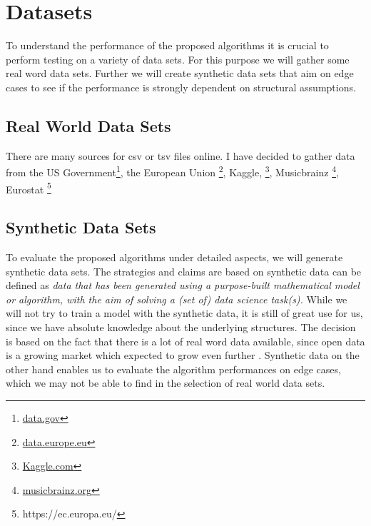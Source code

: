 \section{Datasets}
To understand the performance of the proposed algorithms it is crucial to perform testing on a variety of data sets. For this purpose we will gather some real word data sets. Further we will create synthetic data sets that aim on edge cases to see if the performance is strongly dependent on structural assumptions.

\subsection{Real World Data Sets}
There are many sources for csv or tsv files online. I have decided to gather data from the US Government\footnote{\href{https://data.gov}{data.gov}}, the European Union \footnote{\href{https://data.europe.eu}{data.europe.eu}}, Kaggle, \footnote{\href{https://kaggle.com}{Kaggle.com}}, Musicbrainz \footnote{\href{https://musicbrainz.org/}{musicbrainz.org}}, Eurostat \footnote{https://ec.europa.eu/} 


\subsection{Synthetic Data Sets}
To evaluate the proposed algorithms under detailed aspects, we will generate synthetic data sets. The strategies and claims are based on \cite{jordon2022synthetic} synthetic data can be defined as \textit{data that has been generated using a purpose-built mathematical model or algorithm, with the aim of solving a (set of) data science task(s).} While we will not try to train a model with the synthetic data, it is still of great use for us, since we have absolute knowledge about the underlying structures. The decision is based on the fact that there is a lot of real word data available, since open data is a growing market which expected to grow even further \cite{EUopenData}. Synthetic data on the other hand enables us to evaluate the algorithm performances on edge cases, which we may not be able to find in the selection of real world data sets.

